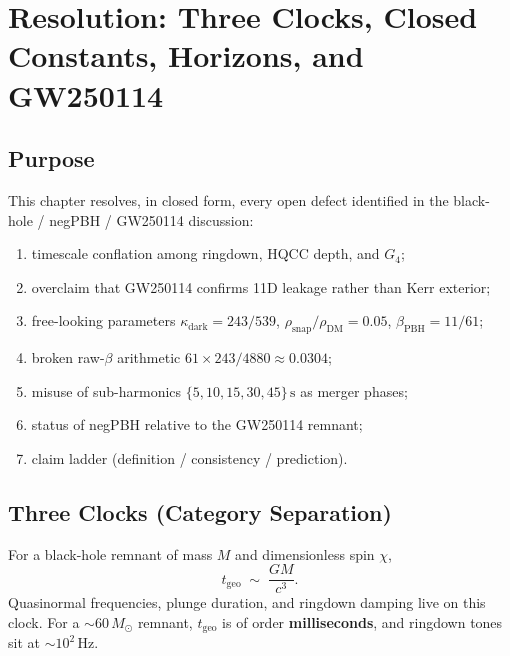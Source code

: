 
\chapter{Resolution: Three Clocks, Closed Constants, Horizons, and GW250114}
\label{ch:resolution}

\section{Purpose}

This chapter resolves, in closed form, every open defect identified in the
black-hole / negPBH / GW250114 discussion:
\begin{enumerate}[label=(\roman*)]
  \item timescale conflation among ringdown, HQCC depth, and \(G_4\);
  \item overclaim that GW250114 confirms 11D leakage rather than Kerr exterior;
  \item free-looking parameters \(\kappa_{\mathrm{dark}} = 243/539\),
        \(\rho_{\mathrm{snap}}/\rho_{\mathrm{DM}}=0.05\), \(\beta_{\mathrm{PBH}} = 11/61\);
  \item broken raw-\(\beta\) arithmetic \(61\times 243/4880\approx 0.0304\);
  \item misuse of sub-harmonics \(\{5,10,15,30,45\}\,\mathrm{s}\) as merger phases;
  \item status of negPBH relative to the GW250114 remnant;
  \item claim ladder (definition / consistency / prediction).
\end{enumerate}

\section{Three Clocks (Category Separation)}
\label{sec:three-clocks}

\begin{definition}
\label{def:clock-I}
For a black-hole remnant of mass \(M\) and dimensionless spin \(\chi\),
\[
t_{\mathrm{geo}} \;\sim\; \frac{GM}{c^3}.
\]
Quasinormal frequencies, plunge duration, and ringdown damping live on this
clock. For a \(\sim 60\,M_\odot\) remnant, \(t_{\mathrm{geo}}\) is of order
\textbf{milliseconds}, and ringdown tones sit at \(\sim 10^2\,\mathrm{Hz}\).
\end{definition}

